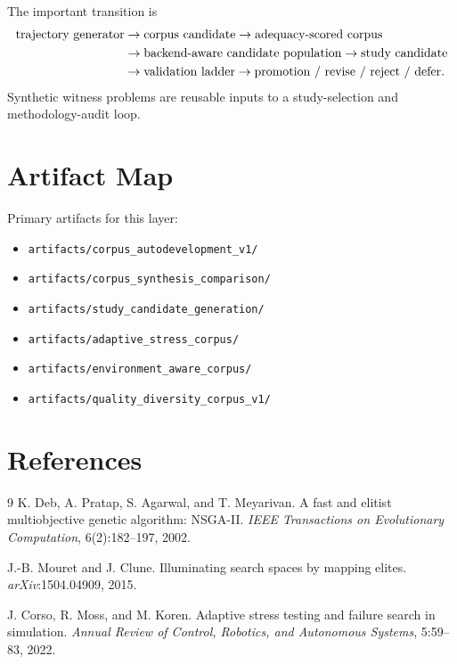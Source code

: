\documentclass[11pt]{article}
\begin{document}
The important transition is
\begin{align}
    \text{trajectory generator}
    &\rightarrow \text{corpus candidate}
    \rightarrow \text{adequacy-scored corpus} \notag \\
    &\rightarrow \text{backend-aware candidate population}
    \rightarrow \text{study candidate} \notag \\
    &\rightarrow \text{validation ladder}
    \rightarrow \text{promotion / revise / reject / defer}.
\end{align}
Synthetic witness problems are reusable inputs to a study-selection and methodology-audit loop.

\section{Artifact Map}

Primary artifacts for this layer:
\begin{itemize}[leftmargin=1.5em]
    \item \texttt{artifacts/corpus\_autodevelopment\_v1/}
    \item \texttt{artifacts/corpus\_synthesis\_comparison/}
    \item \texttt{artifacts/study\_candidate\_generation/}
    \item \texttt{artifacts/adaptive\_stress\_corpus/}
    \item \texttt{artifacts/environment\_aware\_corpus/}
    \item \texttt{artifacts/quality\_diversity\_corpus\_v1/}
\end{itemize}

\section{References}
\begin{thebibliography}{9}
K. Deb, A. Pratap, S. Agarwal, and T. Meyarivan.
\newblock A fast and elitist multiobjective genetic algorithm: NSGA-II.
\newblock \emph{IEEE Transactions on Evolutionary Computation}, 6(2):182--197, 2002.

J.-B. Mouret and J. Clune.
\newblock Illuminating search spaces by mapping elites.
\newblock \emph{arXiv}:1504.04909, 2015.

J. Corso, R. Moss, and M. Koren.
\newblock Adaptive stress testing and failure search in simulation.
\newblock \emph{Annual Review of Control, Robotics, and Autonomous Systems}, 5:59--83, 2022.
\end{thebibliography}
\end{document}
